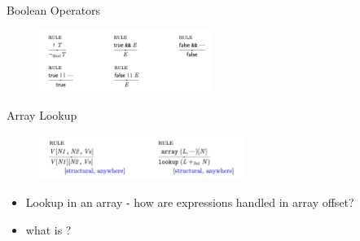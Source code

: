 \documentclass{beamer}
\begin{document}
\begin{frame}{Boolean Operators}
    \begin{figure}
        \centering
    \includegraphics[width=0.5\textwidth]{bool-1}
    \end{figure}
\end{frame}
\begin{frame}{Array Lookup}
    \begin{figure}
        \centering
    \includegraphics[width=0.6\textwidth]{array-lookup}
    \end{figure}

    \pause
    \begin{itemize}
        \item Lookup in an array - how are
            expressions handled in array offset?
        \pause
        \item what is ?
        \pause
    \end{itemize}
\end{frame}
\end{document}
